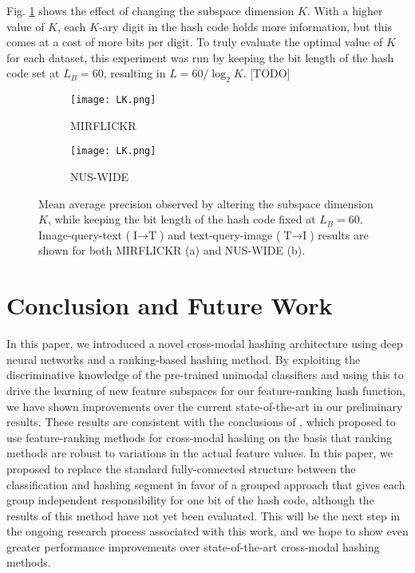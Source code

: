 \documentclass[letterpaper]{article}
\begin{document}
Fig. \ref{fig:K} shows the effect of changing the subspace dimension $ K $. With a higher value of $ K $, each $K$-ary digit in the hash code holds more information, but this comes at a cost of more bits per digit. To truly evaluate the optimal value of $ K $ for each dataset, this experiment was run by keeping the bit length of the hash code set at $ L_B = 60 $, resulting in $ L = 60 / \log_2K $. [TODO]

\begin{figure}

	\begin{subfigure}{0.45\columnwidth}
		\texttt{[image: LK.png]}
		\caption{MIRFLICKR}
	\end{subfigure}
	\begin{subfigure}{0.45\columnwidth}
		\texttt{[image: LK.png]}
		\caption{NUS-WIDE}
	\end{subfigure}
	\caption{\label{fig:K}Mean average precision observed by altering the subspace dimension $ K $, while keeping the bit length of the hash code fixed at $ L_B = 60 $. Image-query-text ($ \text{I} \rightarrow \text{T} $) and text-query-image ($ \text{T} \rightarrow \text{I} $) results are shown for both MIRFLICKR (a) and NUS-WIDE (b).}

\end{figure}

\section{Conclusion and Future Work}

In this paper, we introduced a novel cross-modal hashing architecture using deep neural networks and a ranking-based hashing method. By exploiting the discriminative knowledge of the pre-trained unimodal classifiers and using this to drive the learning of new feature subspaces for our feature-ranking hash function, we have shown improvements over the current state-of-the-art in our preliminary results. These results are consistent with the conclusions of \cite{kai}, which proposed to use feature-ranking methods for cross-modal hashing on the basis that ranking methods are robust to variations in the actual feature values. In this paper, we proposed to replace the standard fully-connected structure between the classification and hashing segment in favor of a grouped approach that gives each group independent responsibility for one bit of the hash code, although the results of this method have not yet been evaluated. This will be the next step in the ongoing research process associated with this work, and we hope to show even greater performance improvements over state-of-the-art cross-modal hashing methods.



\end{document}
